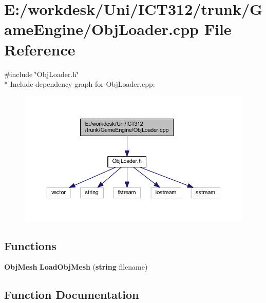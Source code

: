 \section{E\+:/workdesk/\+Uni/\+I\+C\+T312/trunk/\+Game\+Engine/\+Obj\+Loader.cpp File Reference}
\label{_obj_loader_8cpp}
{\ttfamily \#include \char`\"{}Obj\+Loader.\+h\char`\"{}}\\*
Include dependency graph for Obj\+Loader.\+cpp\+:\nopagebreak
\begin{figure}[H]
\begin{center}
\leavevmode
\includegraphics[width=350pt]{d0/d8d/_obj_loader_8cpp__incl}
\end{center}
\end{figure}
\subsection*{Functions}
\begin{DoxyCompactItemize}
\item 
{\bf Obj\+Mesh} {\bf Load\+Obj\+Mesh} ({\bf string} filename)
\end{DoxyCompactItemize}


\subsection{Function Documentation}
